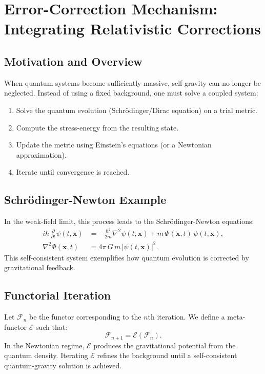 \documentclass[12pt]{article}
\begin{document}
\section{Error-Correction Mechanism: Integrating Relativistic Corrections}
\subsection{Motivation and Overview}
When quantum systems become sufficiently massive, self-gravity can no longer be neglected. Instead of using a fixed background, one must solve a coupled system:
\begin{enumerate}
    \item Solve the quantum evolution (Schrödinger/Dirac equation) on a trial metric.
    \item Compute the stress-energy from the resulting state.
    \item Update the metric using Einstein's equations (or a Newtonian approximation).
    \item Iterate until convergence is reached.
\end{enumerate}

\subsection{Schrödinger-Newton Example}
In the weak-field limit, this process leads to the Schrödinger-Newton equations:
\begin{align}
i\hbar\,\frac{\partial}{\partial t}\psi(t,\mathbf{x}) &= -\frac{\hbar^2}{2m}\nabla^2\psi(t,\mathbf{x})+m\,\Phi(\mathbf{x},t)\,\psi(t,\mathbf{x}),\\[1mm]
\nabla^2\Phi(\mathbf{x},t) &= 4\pi\,G\,m\,|\psi(t,\mathbf{x})|^2.
\end{align}
This self-consistent system exemplifies how quantum evolution is corrected by gravitational feedback.

\subsection{Functorial Iteration}
Let \(\mathcal{F}_n\) be the functor corresponding to the \(n\)th iteration. We define a meta-functor \(\mathcal{E}\) such that:
\[
\mathcal{F}_{n+1}=\mathcal{E}(\mathcal{F}_n).
\]
In the Newtonian regime, \(\mathcal{E}\) produces the gravitational potential from the quantum density. Iterating \(\mathcal{E}\) refines the background until a self-consistent quantum-gravity solution is achieved.
\end{document}
